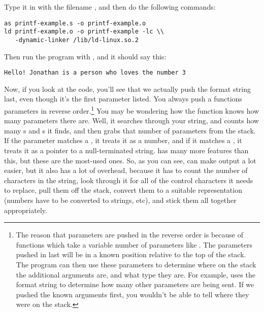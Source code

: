 \begin{simpletyping}

\end{simpletyping}

Type it in with the filename ,
and then do the following commands:

\begin{simpletyping}
\begin{lstlisting}
as printf-example.s -o printf-example.o
ld printf-example.o -o printf-example -lc \\
   -dynamic-linker /lib/ld-linux.so.2
\end{lstlisting}
\end{simpletyping}

Then run the program with , and it
should say this:

\begin{simpletyping}
\begin{lstlisting}
Hello! Jonathan is a person who loves the number 3
\end{lstlisting}
\end{simpletyping}

Now, if you look at the code, you'll see that we actually push
the format string last, even though it's the first parameter listed.  You
always push a functions parameters in reverse order.\footnote{The reason that parameters are pushed in the reverse order is because
of functions which take a variable number of parameters like 
.  The parameters pushed in last 
will be in a known position relative to the top of the stack.  The
program can then use these parameters to determine where on the stack
the additional arguments are, and what type they are.  For example, 
 uses the format string to determine how many
other parameters are being sent.  If we pushed the known arguments first, 
you wouldn't be able to tell where they were on the stack.  
}
You may be wondering
how the  function knows how many parameters
there are.  Well, it searches through your string, and counts how 
many s and s it finds,
and then grabs that number of parameters from the stack.  If the
parameter matches a , it treats it as a number,
and if it matches a , it treats it as a pointer
to a null-terminated string.   has 
many more features than this, but these are the most-used ones.
So, as you can see,  can make output a
lot easier, but it also has a lot of overhead, because it has to
count the number of characters in the string, look through it for all of the
control characters it needs to replace, pull them off the stack,
convert them to a suitable representation (numbers have to be converted
to strings, etc), and stick them all together appropriately.  

